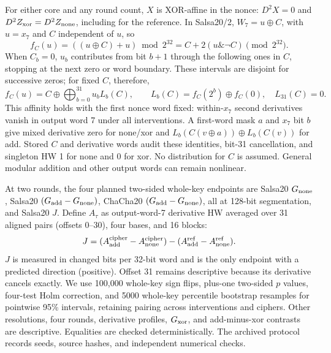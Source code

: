 For either core and any round count, $X$ is XOR-affine in the nonce: $D^2X=0$ and $D^2Z_{\rm xor}=D^2Z_{\rm none}$, including for the reference. In Salsa20/2, $W_7=u\oplus C$, with $u=x_7$ and $C$ independent of $u$, so
\begin{equation}
 f_C(u)=((u\oplus C)+u)\bmod2^{32}
       =C+2(u\mathbin{\&}\neg C)\pmod{2^{32}}.
 \label{eq:ffaffine}
\end{equation}
When $C_b=0$, $u_b$ contributes from bit $b+1$ through the following ones in $C$, stopping at the next zero or word boundary. These intervals are disjoint for successive zeros; for fixed $C$, therefore,
\[
 f_C(u)=C\oplus\bigoplus_{b=0}^{31}u_b L_b(C),\qquad
 L_b(C)=f_C(2^b)\oplus f_C(0),\quad L_{31}(C)=0.
\]
This affinity holds with the first nonce word fixed: within-$x_7$ second derivatives vanish in output word 7 under all interventions. A first-word mask $a$ and $x_7$ bit $b$ give mixed derivative zero for none/xor and $L_b(C(v\oplus a))\oplus L_b(C(v))$ for add. Stored $C$ and derivative words audit these identities, bit-31 cancellation, and singleton HW 1 for none and 0 for xor. No distribution for $C$ is assumed. General modular addition and other output words can remain nonlinear.

At two rounds, the four planned two-sided whole-key endpoints are Salsa20 $G_{\rm none}$, Salsa20 $(G_{\rm add}-G_{\rm none})$, ChaCha20 $(G_{\rm add}-G_{\rm none})$, all at 128-bit segmentation, and Salsa20 $J$. Define $A_\tau$ as output-word-7 derivative HW averaged over 31 aligned pairs (offsets 0--30), four bases, and 16 blocks:
\begin{equation}
 J=(A_{\rm add}^{\rm cipher}-A_{\rm none}^{\rm cipher})
   -(A_{\rm add}^{\rm ref}-A_{\rm none}^{\rm ref}).
 \label{eq:ffinteraction}
\end{equation}
$J$ is measured in changed bits per 32-bit word and is the only endpoint with a predicted direction (positive). Offset 31 remains descriptive because its derivative cancels exactly. We use 100,000 whole-key sign flips, plus-one two-sided $p$ values, four-test Holm correction, and 5000 whole-key percentile bootstrap resamples for pointwise 95\% intervals, retaining pairing across interventions and ciphers. Other resolutions, four rounds, derivative profiles, $G_{\rm xor}$, and add-minus-xor contrasts are descriptive. Equalities are checked deterministically. The archived protocol records seeds, source hashes, and independent numerical checks.
